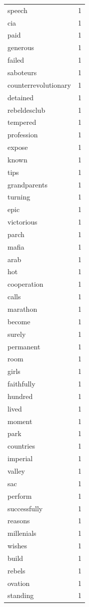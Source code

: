 \begin{tabular}{lr}
speech & 1 \\
cia & 1 \\
paid & 1 \\
generous & 1 \\
failed & 1 \\
saboteurs & 1 \\
counterrevolutionary & 1 \\
detained & 1 \\
rebeldesclub & 1 \\
tempered & 1 \\
profession & 1 \\
expose & 1 \\
known & 1 \\
tips & 1 \\
grandparents & 1 \\
turning & 1 \\
epic & 1 \\
victorious & 1 \\
parch & 1 \\
mafia & 1 \\
arab & 1 \\
hot & 1 \\
cooperation & 1 \\
calls & 1 \\
marathon & 1 \\
become & 1 \\
surely & 1 \\
permanent & 1 \\
room & 1 \\
girls & 1 \\
faithfully & 1 \\
hundred & 1 \\
lived & 1 \\
moment & 1 \\
park & 1 \\
countries & 1 \\
imperial & 1 \\
valley & 1 \\
sac & 1 \\
perform & 1 \\
successfully & 1 \\
reasons & 1 \\
millenials & 1 \\
wishes & 1 \\
build & 1 \\
rebels & 1 \\
ovation & 1 \\
standing & 1 \\

\end{tabular}
